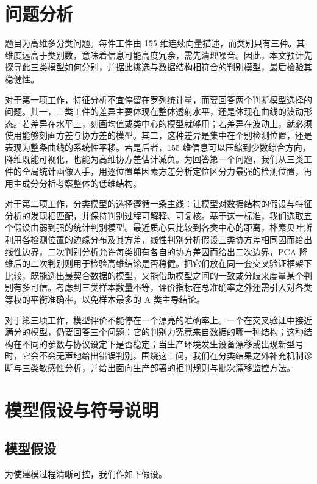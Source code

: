 \documentclass[12pt,a4paper]{article}
\begin{document}
\section{问题分析}

题目为高维多分类问题。每件工件由 155 维连续向量描述，而类别只有三种。其维度远高于类别数，意味着信息可能高度冗余，需先清理噪音。因此，本文预计先探寻此三类模型如何分别，并据此挑选与数据结构相符合的判别模型，最后检验其稳健性。


对于第一项工作，特征分析不宜停留在罗列统计量，而要回答两个判断模型选择的问题。其一，三类工件的差异主要体现在整体透射水平，还是体现在曲线的波动形态。若差异在水平上，刻画均值或类中心的模型就够用；若差异在波动上，就必须使用能够刻画方差与协方差的模型。其二，这种差异是集中在个别检测位置，还是表现为整条曲线的系统性平移。若是后者，155 维信息可以压缩到少数综合方向，降维既能可视化，也能为高维协方差估计减负。为回答第一个问题，我们从三类工件的全局统计画像入手，用逐位置单因素方差分析定位区分力最强的检测位置，再用主成分分析考察整体的低维结构。

对于第二项工作，分类模型的选择遵循一条主线：让模型对数据结构的假设与特征分析的发现相匹配，并保持判别过程可解释、可复核。基于这一标准，我们选取五个假设由弱到强的统计判别模型。最近质心只比较到各类中心的距离，朴素贝叶斯利用各检测位置的边缘分布及其方差，线性判别分析假设三类协方差相同因而给出线性边界，二次判别分析允许每类拥有各自的协方差因而给出二次边界，PCA 降维后的二次判别则用于检验高维结论是否稳健。把它们放在同一套交叉验证框架下比较，既能选出最契合数据的模型，又能借助模型之间的一致或分歧来度量某个判别有多可信。考虑到三类样本数量不等，评价指标在总准确率之外还需引入对各类等权的平衡准确率，以免样本最多的 A 类主导结论。

对于第三项工作，模型评价不能停在一个漂亮的准确率上。一个在交叉验证中接近满分的模型，仍要回答三个问题：它的判别力究竟来自数据的哪一种结构；这种结构在不同的参数与协议设定下是否稳定；当生产环境发生设备漂移或出现新型号时，它会不会无声地给出错误判别。围绕这三问，我们在分类结果之外补充机制诊断与三类敏感性分析，并给出面向生产部署的拒判规则与批次漂移监控方法。

\section{模型假设与符号说明}
\subsection{模型假设}

为使建模过程清晰可控，我们作如下假设。
\end{document}
